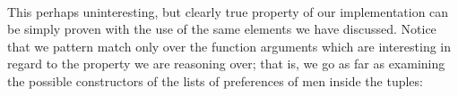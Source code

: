 {\begin{code}%
\>[0]\AgdaSpace{}%
\AgdaSymbol{:}%
\>[1408I]\AgdaSpace{}%
\AgdaSymbol{(}\AgdaSpace{}%
\AgdaSymbol{:}\AgdaSpace{}%
\AgdaSpace{}%
\AgdaSpace{}%
\AgdaSpace{}%
\AgdaSymbol{)(}\AgdaSpace{}%
\AgdaSymbol{:}\AgdaSpace{}%
\AgdaSpace{}%
\AgdaSymbol{(}\AgdaSpace{}%
\AgdaSpace{}%
\AgdaSpace{}%
\AgdaSymbol{))(}\AgdaSpace{}%
\AgdaSymbol{:}\AgdaSpace{}%
\AgdaSymbol{)}\AgdaSpace{}%
\<%
\\
\>[.][@{}l@{}]\<[1408I]%
\>[22]\AgdaSpace{}%
\AgdaSpace{}%
\AgdaSpace{}%
\AgdaSpace{}%
\AgdaOperator{\AgdaPrimitive{+}}\AgdaSpace{}%
\AgdaSpace{}%
\AgdaSymbol{(}\AgdaSpace{}%
\AgdaSpace{}%
\AgdaSymbol{)}\<%
\end{code}

This perhaps uninteresting, but clearly true property of our implementation can be simply proven with the use of the same elements we have discussed. Notice that we pattern match only over the function arguments which are interesting in regard to the property we are reasoning over; that is, we go as far as examining the possible constructors of the lists of preferences of men inside the tuples:

}
